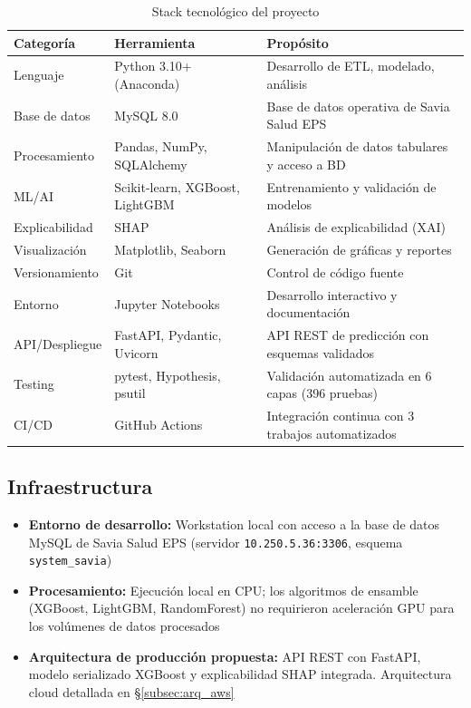 \documentclass[12pt,letterpaper]{report}
\begin{document}
\begin{table}[H]
\centering
\caption{Stack tecnológico del proyecto}
\small
\begin{tabular}{@{}llp{5.4cm}@{}}
\toprule
\textbf{Categoría} & \textbf{Herramienta} & \textbf{Propósito} \\
\midrule
Lenguaje & Python 3.10+ (Anaconda) & Desarrollo de ETL, modelado, análisis \\
Base de datos & MySQL 8.0 & Base de datos operativa de Savia Salud EPS \\
Procesamiento & Pandas, NumPy, SQLAlchemy & Manipulación de datos tabulares y acceso a BD \\
ML/AI & Scikit-learn, XGBoost, LightGBM & Entrenamiento y validación de modelos \\
Explicabilidad & SHAP & Análisis de explicabilidad (XAI) \\
Visualización & Matplotlib, Seaborn & Generación de gráficas y reportes \\
Versionamiento & Git & Control de código fuente \\
Entorno & Jupyter Notebooks & Desarrollo interactivo y documentación \\
API/Despliegue & FastAPI, Pydantic, Uvicorn & API REST de predicción con esquemas validados \\
Testing & pytest, Hypothesis, psutil & Validación automatizada en 6 capas (396 pruebas) \\
CI/CD & GitHub Actions & Integración continua con 3 trabajos automatizados \\
\bottomrule
\end{tabular}
\end{table}

\subsection{Infraestructura}

\begin{itemize}
    \item \textbf{Entorno de desarrollo:} Workstation local con acceso a la base de datos MySQL de Savia Salud EPS (servidor \texttt{10.250.5.36:3306}, esquema \texttt{system\_savia})
    \item \textbf{Procesamiento:} Ejecución local en CPU; los algoritmos de ensamble (XGBoost, LightGBM, RandomForest) no requirieron aceleración GPU para los volúmenes de datos procesados
    \item \textbf{Arquitectura de producción propuesta:} API REST con FastAPI, modelo serializado XGBoost y explicabilidad SHAP integrada. Arquitectura cloud detallada en §\ref{subsec:arq_aws}
\end{itemize}
\end{document}

